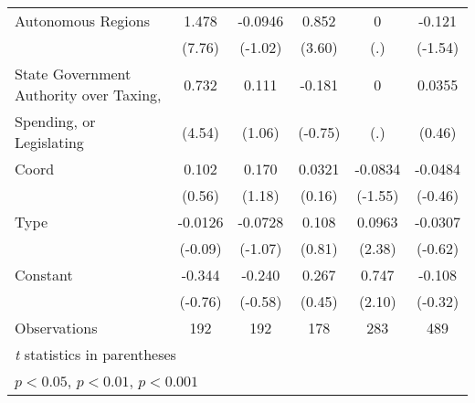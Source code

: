 \begin{table}[htbp]
\begin{tabular}{l*{5}{c}}
\addlinespace
Autonomous Regions                      &    1.478\sym{***}&  -0.0946         &    0.852\sym{**} &        0         &   -0.121         \\
                                        &   (7.76)         &  (-1.02)         &   (3.60)         &      (.)         &  (-1.54)         \\
\addlinespace
State Government Authority over Taxing, &    0.732\sym{***}&    0.111         &   -0.181         &        0         &   0.0355         \\
Spending, or Legislating                &   (4.54)         &   (1.06)         &  (-0.75)         &      (.)         &   (0.46)         \\
\addlinespace
Coord                                   &    0.102         &    0.170         &   0.0321         &  -0.0834         &  -0.0484         \\
                                        &   (0.56)         &   (1.18)         &   (0.16)         &  (-1.55)         &  (-0.46)         \\
\addlinespace
Type                                    &  -0.0126         &  -0.0728         &    0.108         &   0.0963\sym{*}  &  -0.0307         \\
                                        &  (-0.09)         &  (-1.07)         &   (0.81)         &   (2.38)         &  (-0.62)         \\
\addlinespace
Constant                                &   -0.344         &   -0.240         &    0.267         &    0.747\sym{*}  &   -0.108         \\
                                        &  (-0.76)         &  (-0.58)         &   (0.45)         &   (2.10)         &  (-0.32)         \\
\midrule
Observations                            &      192         &      192         &      178         &      283         &      489         \\
\bottomrule
\multicolumn{6}{l}{\footnotesize \textit{t} statistics in parentheses}\\
\multicolumn{6}{l}{\footnotesize \sym{*} \(p<0.05\), \sym{**} \(p<0.01\), \sym{***} \(p<0.001\)}\\
\end{tabular}
\end{table}
